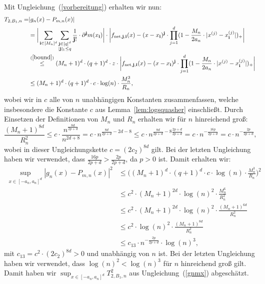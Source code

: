 {Mit Ungleichung~(\ref{vorbereitung}) erhalten wir nun:
\begin{equation}
\label{1stsum}
\begin{split}
T_{2,B_1,n} = & |g_n(x) - P_{m,n}(x)| \\
& = \bigg| \sum_{\mathbf{i} \in [M_n]^d} \sum_{\substack{ \mathbf{j} \in [q]^d \\ |\mathbf{j}|_1 \leq q}} \frac{1}{\mathbf{j}!} \cdot \partial^{\mathbf{j}} m (x_{\mathbf{i}}) \bigg| \cdot \bigg| f_{\mathrm{net},\mathbf{j},\mathbf{i}}(x) - (x - x_{\mathbf{i}})^{\mathbf{j}} \cdot \prod_{j = 1}^d(1 - \frac{M_n}{2a_n} \cdot |x^{(j)} - x_{\mathbf{i}}^{(j)}|)_+ \bigg| \\
& \stackrel{(\ref{bound})}{\leq} (M_n + 1)^d \cdot (q + 1)^d \cdot z \cdot \bigg| f_{\mathrm{net},\mathbf{j},\mathbf{i}}(x) - (x - x_{\mathbf{i}})^{\mathbf{j}} \cdot \prod_{j = 1}^d(1 - \frac{M_n}{2a_n} \cdot |x^{(j)} - x_{\mathbf{i}}^{(j)}|)_+ \bigg| \\
& \leq  (M_n + 1)^d \cdot (q + 1)^d \cdot c\cdot \log(n) \cdot \frac{M_n^3}{R_n},
\end{split}
\end{equation}
wobei wir in $c$ alle von $n$ unabhängigen Konstanten zusammenfassen, welche insbesondere die Konstante $c$ aus Lemma~\ref{lem:logsquasher} einschließt.
Durch Einsetzen der Definitionen von $M_n$ und $R_n$ erhalten wir für $n$ hinreichend groß:
$$
\frac{(M_n + 1)^{8d}}{R_n^2} \leq c \cdot \frac{n^{\frac{8d}{2p + d}}}{n^{2d + 8}} = c \cdot n^{\frac{8d}{2p + d} - 2d -8} \leq c \cdot n^{\frac{8d}{2p + d}  -8\frac{2p + d}{2p + d}} = c \cdot n^{-\frac{16p}{2p + d}} = c \cdot n^{-\frac{2p}{2p + d}},
$$
wobei in dieser Ungleichungskette $c = (2c_2)^{8d}$ gilt.
Bei der letzten Ungleichung haben wir verwendet, dass $\frac{16p}{2p + d} > \frac{2p}{2p + d}$, da $p > 0$ ist. Damit erhalten wir:
\begin{equation}
\label{3rdsum}
\begin{split}
\sup_{x \in [-a_n, a_n]^d} |g_n(x) - P_{m,n}(x)|^2 & \leq \bigg((M_n + 1)^d \cdot (q + 1)^d \cdot c \cdot \log(n) \cdot \frac{M_n^3}{R_n}\bigg)^2 \\
& \leq c^2 \cdot (M_n + 1)^{2d} \cdot \log(n)^2 \cdot \frac{M_n^6}{R_n^2} \\
& \leq  c^2 \cdot (M_n + 1)^{2d} \cdot \log(n)^2 \cdot \frac{(M_n + 1)^{6d}}{R_n^2} \\
& \leq  c^2 \cdot \log(n)^2 \cdot \frac{(M_n + 1)^{8d}}{R_n^2} \\
& \leq c_{13} \cdot n^{-\frac{2p}{2p + d}} \cdot \log(n)^3,
\end{split}
\end{equation}
mit $c_{13} = c^2 \cdot (2c_2)^{8d} > 0$ und unabhängig von $n$ ist. Bei der letzten Ungleichung haben wir verwendet, dass $\log(n)^2 < \log(n)^3$ für $n$ hinreichend groß gilt. Damit haben wir $\sup_{x \in [-a_n, a_n]^d} T_{2,B_1,n}^2$ aus Ungleichung~(\ref{gnmx}) abgeschätzt.

}
